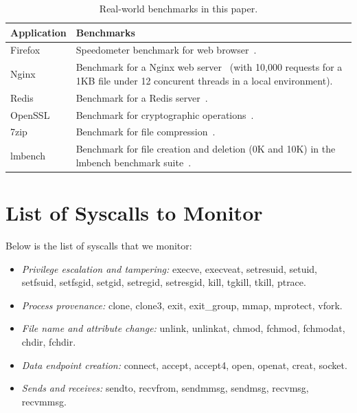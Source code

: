\documentclass[sigconf]{sty/acmart}
\begin{document}
\begin{appendix}
\begin{table}[H]
\centering
\small
\caption{Real-world benchmarks in this paper.}
\label{tab:real}
\renewcommand{\arraystretch}{1.2}
\begin{tabularx}{0.46\textwidth}{>{\raggedright\arraybackslash}p{}X}
  \toprule[1pt]
\textbf{Application} & \textbf{Benchmarks} \\ \midrule
Firefox~\cite{firefox} & Speedometer benchmark for web browser~\cite{firebench}. \\ 
Nginx~\cite{nginx} &  Benchmark for a Nginx web server~\cite{abbench} (with 10,000 requests for a 1KB file
under 12 concurent threads in a local environment). \\ 
Redis~\cite{redis} & Benchmark for a Redis server~\cite{redisbench}. \\ 
OpenSSL~\cite{openssl} & Benchmark for cryptographic operations~\cite{phoronix}. \\ 
7zip~\cite{7zip} &  Benchmark for file compression~\cite{phoronix}. \\ 
lmbench & Benchmark for file creation and deletion (0K and 10K) in the lmbench benchmark suite~\cite{lmbench}.  \\
\bottomrule[1pt]
\end{tabularx}
\end{table}


\section{List of Syscalls to Monitor}
\label{app:syscalls}

Below is the list of syscalls that we monitor:

\begin{itemize}
\item \emph{Privilege escalation and tampering:} execve, execveat,  setresuid, setuid,
setfsuid, setfsgid, setgid, setregid, \mbox{setresgid}, kill, tgkill, tkill, ptrace.

\item \emph{Process provenance:} clone, clone3, exit, exit\_group,  mmap, mprotect, vfork.

\item \emph{File name and attribute change:} unlink, unlinkat, chmod, fchmod, fchmodat, chdir, fchdir.

\item \emph{Data endpoint creation:} connect, accept, accept4, open, openat, creat, socket.

\item \emph{Sends and receives:} sendto, recvfrom, sendmmsg, sendmsg, recvmsg, recvmmsg.


\end{itemize}
\end{appendix}
\end{document}
